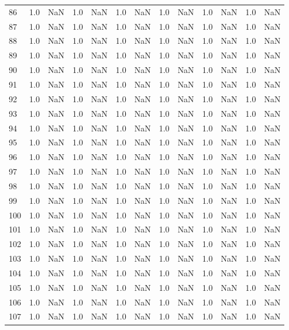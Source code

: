\begin{tabular}{lrrrrrrrrrrrr}
86 & 1.0 & NaN & 1.0 & NaN & 1.0 & NaN & 1.0 & NaN & 1.0 & NaN & 1.0 & NaN \\
87 & 1.0 & NaN & 1.0 & NaN & 1.0 & NaN & 1.0 & NaN & 1.0 & NaN & 1.0 & NaN \\
88 & 1.0 & NaN & 1.0 & NaN & 1.0 & NaN & 1.0 & NaN & 1.0 & NaN & 1.0 & NaN \\
89 & 1.0 & NaN & 1.0 & NaN & 1.0 & NaN & 1.0 & NaN & 1.0 & NaN & 1.0 & NaN \\
90 & 1.0 & NaN & 1.0 & NaN & 1.0 & NaN & 1.0 & NaN & 1.0 & NaN & 1.0 & NaN \\
91 & 1.0 & NaN & 1.0 & NaN & 1.0 & NaN & 1.0 & NaN & 1.0 & NaN & 1.0 & NaN \\
92 & 1.0 & NaN & 1.0 & NaN & 1.0 & NaN & 1.0 & NaN & 1.0 & NaN & 1.0 & NaN \\
93 & 1.0 & NaN & 1.0 & NaN & 1.0 & NaN & 1.0 & NaN & 1.0 & NaN & 1.0 & NaN \\
94 & 1.0 & NaN & 1.0 & NaN & 1.0 & NaN & 1.0 & NaN & 1.0 & NaN & 1.0 & NaN \\
95 & 1.0 & NaN & 1.0 & NaN & 1.0 & NaN & 1.0 & NaN & 1.0 & NaN & 1.0 & NaN \\
96 & 1.0 & NaN & 1.0 & NaN & 1.0 & NaN & 1.0 & NaN & 1.0 & NaN & 1.0 & NaN \\
97 & 1.0 & NaN & 1.0 & NaN & 1.0 & NaN & 1.0 & NaN & 1.0 & NaN & 1.0 & NaN \\
98 & 1.0 & NaN & 1.0 & NaN & 1.0 & NaN & 1.0 & NaN & 1.0 & NaN & 1.0 & NaN \\
99 & 1.0 & NaN & 1.0 & NaN & 1.0 & NaN & 1.0 & NaN & 1.0 & NaN & 1.0 & NaN \\
100 & 1.0 & NaN & 1.0 & NaN & 1.0 & NaN & 1.0 & NaN & 1.0 & NaN & 1.0 & NaN \\
101 & 1.0 & NaN & 1.0 & NaN & 1.0 & NaN & 1.0 & NaN & 1.0 & NaN & 1.0 & NaN \\
102 & 1.0 & NaN & 1.0 & NaN & 1.0 & NaN & 1.0 & NaN & 1.0 & NaN & 1.0 & NaN \\
103 & 1.0 & NaN & 1.0 & NaN & 1.0 & NaN & 1.0 & NaN & 1.0 & NaN & 1.0 & NaN \\
104 & 1.0 & NaN & 1.0 & NaN & 1.0 & NaN & 1.0 & NaN & 1.0 & NaN & 1.0 & NaN \\
105 & 1.0 & NaN & 1.0 & NaN & 1.0 & NaN & 1.0 & NaN & 1.0 & NaN & 1.0 & NaN \\
106 & 1.0 & NaN & 1.0 & NaN & 1.0 & NaN & 1.0 & NaN & 1.0 & NaN & 1.0 & NaN \\
107 & 1.0 & NaN & 1.0 & NaN & 1.0 & NaN & 1.0 & NaN & 1.0 & NaN & 1.0 & NaN \\

\end{tabular}
